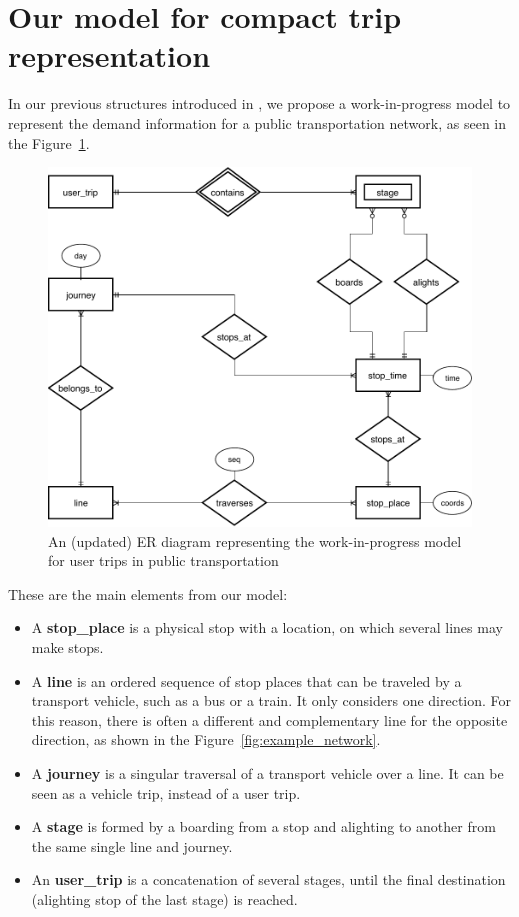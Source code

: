 \documentclass[runningheads]{llncs}
\begin{document}
\section{Our model for compact trip representation}
\label{sec:model}
In our previous structures introduced in \cite{brisaboa2018new}, we propose a work-in-progress model to represent the demand information for a public transportation network, as seen in the Figure~\ref{fig:er}.

\begin{figure}
\includegraphics[width=\textwidth]{NetworkER.pdf}
\caption{An (updated) ER diagram representing the work-in-progress model for user trips in public transportation}
\label{fig:er}
\end{figure}

These are the main elements from our model:
\begin{itemize}
    \item A \textbf{stop\_place} is a physical stop with a location, on which several lines may make stops.
    \item A \textbf{line} is an ordered sequence of stop places that can be traveled by a transport vehicle, such as a bus or a train. It only considers one direction. For this reason, there is often a different and complementary line for the opposite direction, as shown in the Figure~\ref{fig:example_network}.
    \item A \textbf{journey} is a singular traversal of a transport vehicle over a line. It can be seen as a vehicle trip, instead of a user trip.
    \item A \textbf{stage} is formed by a boarding from a stop and alighting to another from the same single line and journey.
    \item An \textbf{user\_trip} is a concatenation of several stages, until the final destination (alighting stop of the last stage) is reached.
\end{itemize}
\end{document}
